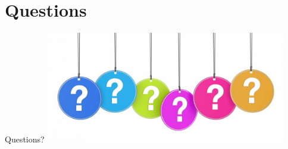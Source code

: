 \documentclass{beamer}
\begin{document}
\section{Questions}
\begin{frame}{Questions?}
\vspace{-1.8cm}
    \includegraphics[width = 10.5cm]{que.jpg} \\
\end{frame}


\ThankYouFrame
\end{document}
